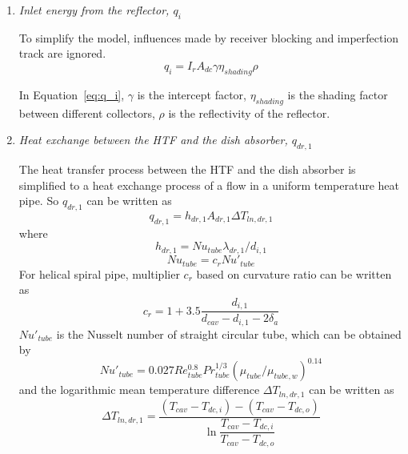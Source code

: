 \begin{enumerate}
  \item \emph{Inlet energy from the reflector, $q_i$}
  
  To simplify the model, influences made by receiver blocking and imperfection track are ignored.  
  \begin{equation}\label{eq:q_i}
      q_i = I_r A_{dc} \gamma \eta_{shading} \rho
  \end{equation}
  
  In Equation~\ref{eq:q_i}, $\gamma$ is the intercept factor, $\eta_{shading}$ is the shading factor between different collectors, $\rho$ is the reflectivity of the reflector.
  \item \emph{Heat exchange between the HTF and the dish absorber, $q_{dr,1}$}
  
  The heat transfer process between the HTF and the dish absorber is simplified to a heat exchange process of a flow in a uniform temperature heat pipe. So $q_{dr,1}$ can be written as  
  \begin{equation}\label{eq:q_dr_1}
      q_{dr,1} = h_{dr,1}A_{dr,1}\Delta T_{ln,dr,1}
  \end{equation}
  where  
  \begin{equation}
      h_{dr,1} = Nu_{tube}\lambda_{dr,1} / d_{i,1}
\end{equation}
\begin{equation}
      Nu_{tube} = c_r Nu'_{tube}
\end{equation}
    For helical spiral pipe, multiplier $c_r$ based on curvature ratio can be written as~\cite{Pablo2008}
\begin{equation}
	c_{r}=1+3.5\frac{d_{i,1}}{d_{cav}-d_{i,1}-2\delta_{a}}
\end{equation}
$Nu'_{tube}$ is the Nusselt number of straight circular tube, which can be obtained by~\cite{Serth2007}
\begin{equation}
	Nu'_{tube}= 0.027Re_{tube}^{0.8}Pr_{tube}^{1/3}(\mu_{tube}/\mu_{tube,w})^{0.14}
\end{equation}
and the logarithmic mean temperature difference $\Delta{}T_{ln,dr,1}$ can be written as
\begin{equation}
	\Delta{}T_{ln,dr,1}=\frac{(T_{cav}-T_{dc,i})-(T_{cav}-T_{dc,o})}{\ln\dfrac{T_{cav}-T_{dc,i}}{T_{cav}-T_{dc,o}}}
\end{equation}


\end{enumerate}
